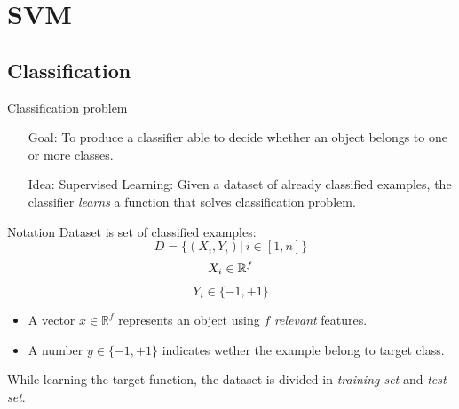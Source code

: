 \section{SVM}
\subsection{Classification}
\begin{frame}{Classification problem}
	\begin{itemize}\setlength\itemsep{1em}
		\item[Goal:] To produce a classifier able to decide whether an object belongs to one or more classes.
		\item[Idea:] Supervised Learning: Given a dataset of already classified examples, the classifier \textit{learns} a function that solves classification problem.
	\end{itemize}
\end{frame}

\begin{frame}{Notation}
	Dataset is set of classified examples:
	$$D = \{(X_i, Y_i) | \ i \in [1, n]\}$$
	$$X_i \in \mathbb{R}^f$$
	$$Y_i \in \{-1, +1\}$$
	\begin{itemize}\setlength\itemsep{1em}
		\item A vector $x \in \mathbb{R}^f$ represents an object using $f$ \textit{relevant} features.
		\item A number $y \in \{-1 , +1\}$ indicates wether the example belong to target class.
	\end{itemize}
	
	While learning the target function, the dataset is divided in \textit{training set} and \textit{test set}.
\end{frame}

